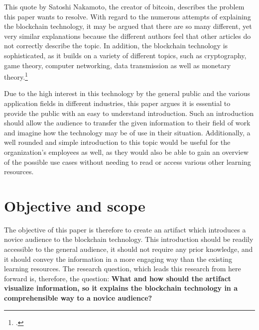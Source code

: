 This quote by Satoshi Nakamoto, the creator of bitcoin, describes the problem this paper wants to resolve. 
With regard to the numerous attempts of explaining the blockchain technology, it may be argued that there are so many different, yet very similar explanations because the different authors feel that other articles do not correctly describe the topic. In addition, the blockchain technology is sophisticated, as it builds on a variety of different topics, such as cryptography, game theory, computer networking, data transmission as well as monetary theory.\footcite[Cf.][]{LoppNobodyUnderstandsBitcoin2017} 

Due to the high interest in this technology by the general public and the various application fields in different industries, this paper argues it is essential to provide the public with an easy to understand introduction. Such an introduction should allow the audience to transfer the given information to their field of work and imagine how the technology may be of use in their situation. %
Additionally, a well rounded and simple introduction to this topic would be useful for the organization's employees as well, as they would also be able to gain an overview of the possible use cases without needing to read or access various other learning resources.

\section{Objective and scope} \label{sec:Objective}

The objective of this paper is therefore to create an artifact which introduces a novice audience to the blockchain technology. This introduction should be readily accessible to the general audience, it should not require any prior knowledge, and it should convey the information in a more engaging way than the existing learning resources. The research question, which leads this research from here forward is, therefore, the question: \textbf{What and how should the artifact visualize information, so it explains the blockchain technology in a comprehensible way to a novice audience?}

